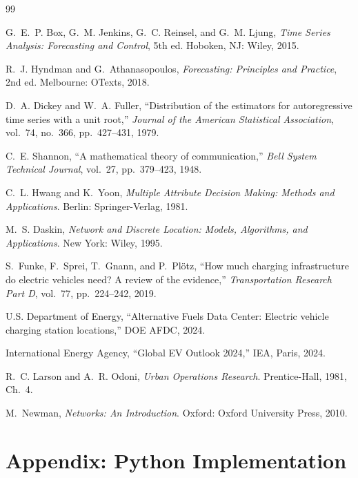 \documentclass[11pt]{article}
\begin{document}
\newpage
\begin{thebibliography}{99}

G.~E.~P. Box, G.~M. Jenkins, G.~C. Reinsel, and G.~M. Ljung, \emph{Time Series Analysis: Forecasting and Control}, 5th ed. Hoboken, NJ: Wiley, 2015.

R.~J. Hyndman and G.~Athanasopoulos, \emph{Forecasting: Principles and Practice}, 2nd ed. Melbourne: OTexts, 2018.

D.~A. Dickey and W.~A. Fuller, ``Distribution of the estimators for autoregressive time series with a unit root,'' \emph{Journal of the American Statistical Association}, vol.~74, no.~366, pp.~427--431, 1979.

C.~E. Shannon, ``A mathematical theory of communication,'' \emph{Bell System Technical Journal}, vol.~27, pp.~379--423, 1948.

C.~L. Hwang and K.~Yoon, \emph{Multiple Attribute Decision Making: Methods and Applications}. Berlin: Springer-Verlag, 1981.

M.~S. Daskin, \emph{Network and Discrete Location: Models, Algorithms, and Applications}. New York: Wiley, 1995.

S.~Funke, F.~Sprei, T.~Gnann, and P.~Pl\"otz, ``How much charging infrastructure do electric vehicles need? A review of the evidence,'' \emph{Transportation Research Part D}, vol.~77, pp.~224--242, 2019.

U.S. Department of Energy, ``Alternative Fuels Data Center: Electric vehicle charging station locations,'' DOE AFDC, 2024.

International Energy Agency, ``Global EV Outlook 2024,'' IEA, Paris, 2024.

R.~C. Larson and A.~R. Odoni, \emph{Urban Operations Research}. Prentice-Hall, 1981, Ch.~4.

M.~Newman, \emph{Networks: An Introduction}. Oxford: Oxford University Press, 2010.

\end{thebibliography}

\newpage
\appendix
\section{Appendix: Python Implementation}
\label{app:code}
\end{document}
